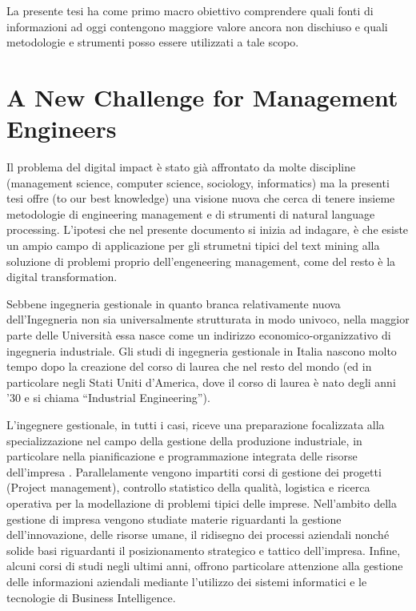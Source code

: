 \documentclass[]{book}
\begin{document}
La presente tesi ha come primo macro obiettivo comprendere quali fonti
di informazioni ad oggi contengono maggiore valore ancora non dischiuso
e quali metodologie e strumenti posso essere utilizzati a tale scopo.

\section{A New Challenge for Management
Engineers}\label{a-new-challenge-for-management-engineers}

Il problema del digital impact è stato già affrontato da molte
discipline (management science, computer science, sociology,
informatics) ma la presenti tesi offre (to our best knowledge) una
visione nuova che cerca di tenere insieme metodologie di engineering
management e di strumenti di natural language processing. L'ipotesi che
nel presente documento si inizia ad indagare, è che esiste un ampio
campo di applicazione per gli strumetni tipici del text mining alla
soluzione di problemi proprio dell'engeneering management, come del
resto è la digital transformation.

Sebbene ingegneria gestionale in quanto branca relativamente nuova
dell'Ingegneria non sia universalmente strutturata in modo univoco,
nella maggior parte delle Università essa nasce come un indirizzo
economico-organizzativo di ingegneria industriale. Gli studi di
ingegneria gestionale in Italia nascono molto tempo dopo la creazione
del corso di laurea che nel resto del mondo (ed in particolare negli
Stati Uniti d'America, dove il corso di laurea è nato degli anni '30 e
si chiama ``Industrial Engineering'').

L'ingegnere gestionale, in tutti i casi, riceve una preparazione
focalizzata alla specializzazione nel campo della gestione della
produzione industriale, in particolare nella pianificazione e
programmazione integrata delle risorse dell'impresa . Parallelamente
vengono impartiti corsi di gestione dei progetti (Project management),
controllo statistico della qualità, logistica e ricerca operativa per la
modellazione di problemi tipici delle imprese. Nell'ambito della
gestione di impresa vengono studiate materie riguardanti la gestione
dell'innovazione, delle risorse umane, il ridisegno dei processi
aziendali nonché solide basi riguardanti il posizionamento strategico e
tattico dell'impresa. Infine, alcuni corsi di studi negli ultimi anni,
offrono particolare attenzione alla gestione delle informazioni
aziendali mediante l'utilizzo dei sistemi informatici e le tecnologie di
Business Intelligence.
\end{document}
